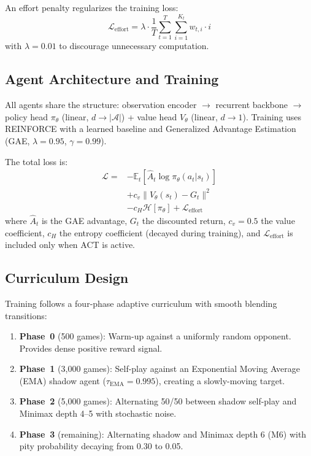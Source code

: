 \documentclass[conference]{IEEEtran}
\newcommand{\E}{\mathbb{E}}
\begin{document}
An effort penalty regularizes the training loss:
\begin{equation}
\label{eq:effort_penalty}
\mathcal{L}_{\text{effort}} = \lambda \cdot \frac{1}{T} \sum_{t=1}^{T} \sum_{i=1}^{K_t} w_{t,i} \cdot i
\end{equation}
with $\lambda = 0.01$ to discourage unnecessary computation.


\subsection{Agent Architecture and Training}
\label{ssec:agent}

All agents share the structure: observation encoder $\to$ recurrent backbone $\to$ policy head $\pi_\theta$ (linear, $d \to |\mathcal{A}|$) + value head $V_\theta$ (linear, $d \to 1$). Training uses REINFORCE with a learned baseline and Generalized Advantage Estimation (GAE, $\lambda = 0.95$, $\gamma = 0.99$).

The total loss is:
\begin{equation}
\label{eq:total_loss}
\begin{aligned}
\mathcal{L} = &-\E_t[\hat{A}_t \log \pi_\theta(a_t | s_t)] \\
             &+ c_v \| V_\theta(s_t) - G_t \|^2 \\
             &- c_H \mathcal{H}[\pi_\theta] + \mathcal{L}_{\text{effort}}
\end{aligned}
\end{equation}
where $\hat{A}_t$ is the GAE advantage, $G_t$ the discounted return, $c_v = 0.5$ the value coefficient, $c_H$ the entropy coefficient (decayed during training), and $\mathcal{L}_{\text{effort}}$ is included only when ACT is active.

\subsection{Curriculum Design}
\label{ssec:curriculum}

Training follows a four-phase adaptive curriculum with smooth blending transitions:

\begin{enumerate}
    \item \textbf{Phase~0} (500 games): Warm-up against a uniformly random opponent. Provides dense positive reward signal.
    \item \textbf{Phase~1} (3{,}000 games): Self-play against an Exponential Moving Average (EMA) shadow agent ($\tau_{\text{EMA}} = 0.995$), creating a slowly-moving target.
    \item \textbf{Phase~2} (5{,}000 games): Alternating 50/50 between shadow self-play and Minimax depth 4--5 with stochastic noise.
    \item \textbf{Phase~3} (remaining): Alternating shadow and Minimax depth 6 (M6) with pity probability decaying from 0.30 to 0.05.
\end{enumerate}
\end{document}
